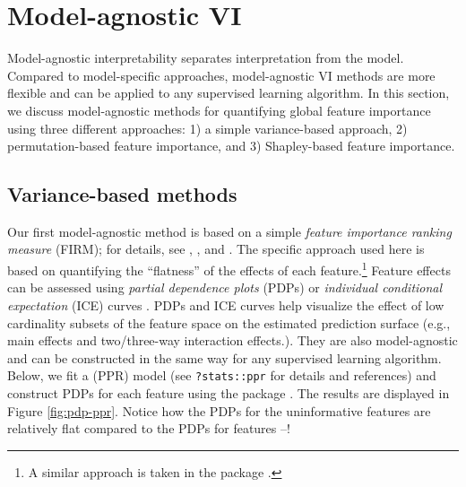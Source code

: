 \section{Model-agnostic VI}

Model-agnostic interpretability separates interpretation from the model.
Compared to model-specific approaches, model-agnostic VI methods are
more flexible and can be applied to any supervised learning algorithm.
In this section, we discuss model-agnostic methods for quantifying
global feature importance using three different approaches: 1) a simple
variance-based approach, 2) permutation-based feature importance, and 3)
Shapley-based feature importance.

\subsection{Variance-based methods}

Our first model-agnostic method is based on a simple \emph{feature
importance ranking measure} (FIRM); for details, see
\citet{greenwell-simple-2018}, \citet{zien-2009-feature}, and
\citet{scholbeck-2019-sampling}. The specific approach used here is
based on quantifying the ``flatness'' of the effects of each
feature.\footnote{A similar approach is taken in the 
  package \citep{R-vivo}.} Feature effects can be assessed using
\emph{partial dependence plots} (PDPs) \citep{friedman-2001-greedy} or
\emph{individual conditional expectation} (ICE) curves
\citep{goldstein-peeking-2015}. PDPs and ICE curves help visualize the
effect of low cardinality subsets of the feature space on the estimated
prediction surface (e.g., main effects and two/three-way interaction
effects.). They are also model-agnostic and can be constructed in the
same way for any supervised learning algorithm. Below, we fit a
 (PPR) model (see
\texttt{?stats::ppr} for details and references) and construct PDPs for
each feature using the  package \citet{pdp2017}. The
results are displayed in Figure \ref{fig:pdp-ppr}. Notice how the PDPs
for the uninformative features are relatively flat compared to the PDPs
for features --!

